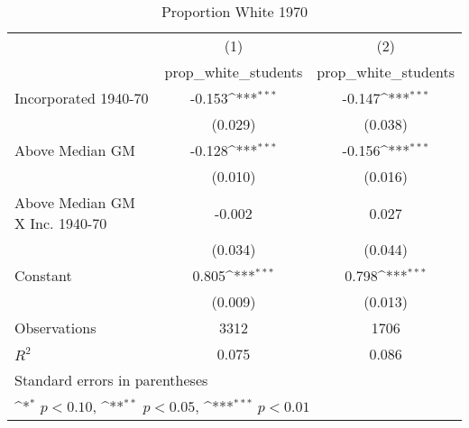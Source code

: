 \begin{table}[htbp]\centering
\def\sym#1{\ifmmode^{#1}\else\(^{#1}\)\fi}
\caption{Proportion White 1970}
\begin{tabular}{l*{2}{c}}
\hline\hline
                    &\multicolumn{1}{c}{(1)}&\multicolumn{1}{c}{(2)}\\
                    &\multicolumn{1}{c}{prop\_white\_students}&\multicolumn{1}{c}{prop\_white\_students}\\
\hline
Incorporated 1940-70&      -0.153\sym{***}&      -0.147\sym{***}\\
                    &     (0.029)         &     (0.038)         \\
[1em]
Above Median GM     &      -0.128\sym{***}&      -0.156\sym{***}\\
                    &     (0.010)         &     (0.016)         \\
[1em]
Above Median GM X Inc. 1940-70&      -0.002         &       0.027         \\
                    &     (0.034)         &     (0.044)         \\
[1em]
Constant            &       0.805\sym{***}&       0.798\sym{***}\\
                    &     (0.009)         &     (0.013)         \\
\hline
Observations        &        3312         &        1706         \\
\(R^{2}\)           &       0.075         &       0.086         \\
\hline\hline
\multicolumn{3}{l}{\footnotesize Standard errors in parentheses}\\
\multicolumn{3}{l}{\footnotesize \sym{*} \(p<0.10\), \sym{**} \(p<0.05\), \sym{***} \(p<0.01\)}\\
\end{tabular}
\end{table}
